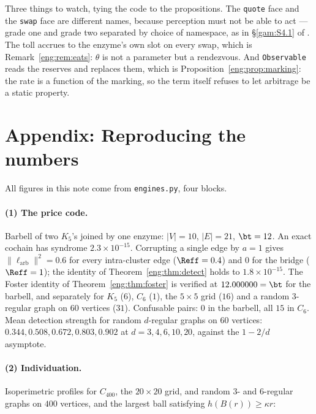 Three things to watch, tying the code to the propositions. The
\texttt{quote} face and the \texttt{swap} face are different names, because
perception must not be able to act --- grade one and grade two separated by
choice of namespace, as in \S\ref{gam:S4.1} of \chGame. The toll accrues to the
enzyme's own slot on every swap, which is Remark~\ref{eng:rem:eats}: $\theta$ is
not a parameter but a rendezvous. And \texttt{Observable} reads the
reserves and replaces them, which is Proposition~\ref{eng:prop:marking}: the
rate is a function of the marking, so the term itself refuses to let
arbitrage be a static property.

\section{Appendix: Reproducing the numbers}\label{eng:S16}
\label{eng:app:repro}

All figures in this note come from \texttt{engines.py}, four blocks.

\paragraph{(1) The price code.} Barbell of two $K_5$'s joined by one
enzyme: $|V| = 10$, $|E| = 21$, $\bt = 12$. An exact cochain has syndrome
$2.3 \times 10^{-15}$. Corrupting a single edge by $a = 1$ gives
$\|\ell_{\mathrm{arb}}\|^2 = 0.6$ for every intra-cluster edge
($\Reff = 0.4$) and $0$ for the bridge ($\Reff = 1$); the identity of
Theorem~\ref{eng:thm:detect} holds to $1.8\times10^{-15}$. The Foster identity
of Theorem~\ref{eng:thm:foster} is verified at $12.000000 = \bt$ for the
barbell, and separately for $K_5$ ($6$), $C_6$ ($1$), the $5\times5$ grid
($16$) and a random $3$-regular graph on $60$ vertices ($31$). Confusable
pairs: $0$ in the barbell, all $15$ in $C_6$. Mean detection strength for
random $d$-regular graphs on $60$ vertices: $0.344, 0.508, 0.672, 0.803,
0.902$ at $d = 3,4,6,10,20$, against the $1-2/d$ asymptote.

\paragraph{(2) Individuation.} Isoperimetric profiles for $C_{400}$, the
$20\times20$ grid, and random $3$- and $6$-regular graphs on $400$
vertices, and the largest ball satisfying $h(B(r)) \geq \kappa r$:

\begin{center}\small
{}
\end{center}

